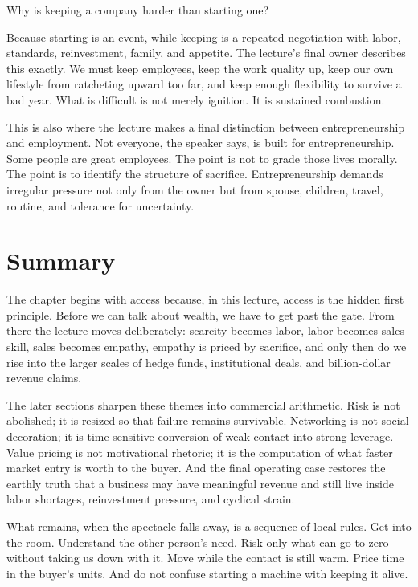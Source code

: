 Why is keeping a company harder than starting one?

Because starting is an event, while keeping is a repeated negotiation with labor, standards, reinvestment, family, and appetite. The lecture's final owner describes this exactly. We must keep employees, keep the work quality up, keep our own lifestyle from ratcheting upward too far, and keep enough flexibility to survive a bad year. What is difficult is not merely ignition. It is sustained combustion.

This is also where the lecture makes a final distinction between entrepreneurship and employment. Not everyone, the speaker says, is built for entrepreneurship. Some people are great employees. The point is not to grade those lives morally. The point is to identify the structure of sacrifice. Entrepreneurship demands irregular pressure not only from the owner but from spouse, children, travel, routine, and tolerance for uncertainty.

\section{Summary}

The chapter begins with access because, in this lecture, access is the hidden first principle. Before we can talk about wealth, we have to get past the gate. From there the lecture moves deliberately: scarcity becomes labor, labor becomes sales skill, sales becomes empathy, empathy is priced by sacrifice, and only then do we rise into the larger scales of hedge funds, institutional deals, and billion-dollar revenue claims.

The later sections sharpen these themes into commercial arithmetic. Risk is not abolished; it is resized so that failure remains survivable. Networking is not social decoration; it is time-sensitive conversion of weak contact into strong leverage. Value pricing is not motivational rhetoric; it is the computation of what faster market entry is worth to the buyer. And the final operating case restores the earthly truth that a business may have meaningful revenue and still live inside labor shortages, reinvestment pressure, and cyclical strain.

What remains, when the spectacle falls away, is a sequence of local rules. Get into the room. Understand the other person's need. Risk only what can go to zero without taking us down with it. Move while the contact is still warm. Price time in the buyer's units. And do not confuse starting a machine with keeping it alive.